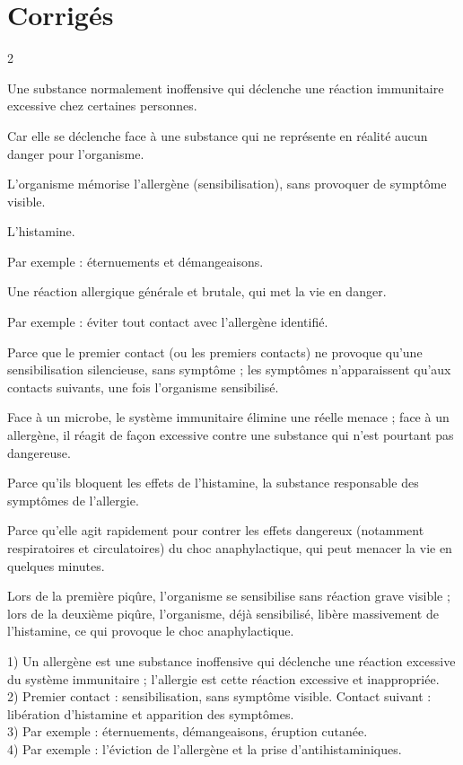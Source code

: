 \section{Corrigés}
\begin{multicols}{2}

Une substance normalement inoffensive qui déclenche une réaction immunitaire
excessive chez certaines personnes.

Car elle se déclenche face à une substance qui ne représente en réalité aucun danger
pour l'organisme.

L'organisme mémorise l'allergène (sensibilisation), sans provoquer de symptôme
visible.

L'histamine.

Par exemple : éternuements et démangeaisons.

Une réaction allergique générale et brutale, qui met la vie en danger.

Par exemple : éviter tout contact avec l'allergène identifié.

Parce que le premier contact (ou les premiers contacts) ne provoque qu'une
sensibilisation silencieuse, sans symptôme ; les symptômes n'apparaissent qu'aux
contacts suivants, une fois l'organisme sensibilisé.

Face à un microbe, le système immunitaire élimine une réelle menace ; face à un
allergène, il réagit de façon excessive contre une substance qui n'est pourtant pas
dangereuse.

Parce qu'ils bloquent les effets de l'histamine, la substance responsable des
symptômes de l'allergie.

Parce qu'elle agit rapidement pour contrer les effets dangereux (notamment
respiratoires et circulatoires) du choc anaphylactique, qui peut menacer la vie en
quelques minutes.

Lors de la première piqûre, l'organisme se sensibilise sans réaction grave visible ;
lors de la deuxième piqûre, l'organisme, déjà sensibilisé, libère massivement de
l'histamine, ce qui provoque le choc anaphylactique.

1) Un allergène est une substance inoffensive qui déclenche une réaction excessive du
système immunitaire ; l'allergie est cette réaction excessive et inappropriée.\\
2) Premier contact : sensibilisation, sans symptôme visible. Contact suivant :
libération d'histamine et apparition des symptômes.\\
3) Par exemple : éternuements, démangeaisons, éruption cutanée.\\
4) Par exemple : l'éviction de l'allergène et la prise d'antihistaminiques.

\end{multicols}
\exercicesBanner
